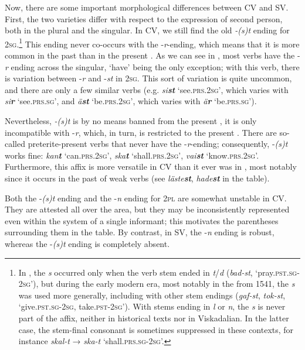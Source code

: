 \documentclass[output=paper,colorlinks,citecolor=brown,draft,draftmode]{langscibook}
\begin{document}
Now, there are some important morphological differences between CV and SV. First, the two varieties differ with respect to the expression of second person, both in the plural and the singular. In CV, we still find the old \textit{-(s)t} ending for 2\textsc{sg}.\footnote{In , the \textit{s} occurred only when the verb stem ended in \textit{t}/\textit{d} (\textit{bad-st}, ‘pray.\textsc{pst.sg}-\textsc{2sg}’), but during the early modern era, most notably in the  from 1541, the \textit{s} was used more generally, including with other stem endings (\textit{gaf-st}, \textit{tok-st}, ‘give.\textsc{pst.sg}-2\textsc{sg}, take.\textsc{pst}-\textsc{2sg}’). With stems ending in \textit{l} or \textit{n}, the \textit{s} is never part of the affix, neither in historical texts nor in Viskadalian. In the latter case, the stem-final consonant is sometimes suppressed in these contexts, for instance \textit{skal-t} → \textit{ska-t} ‘shall.\textsc{prs.sg}-2\textsc{sg}’.} This ending never co-occurs with the -\textit{r}-ending, which means that it is more common in the past than in the present . As we can see in , most verbs have the -\textit{r} ending across the singular, ‘have’ being the only exception; with this verb, there is variation between -\textit{r} and -\textit{st} in 2\textsc{sg}. This sort of variation is quite uncommon, and there are only a few similar verbs (e.g. \textit{si\textbf{{st}}} ‘see.\textsc{prs}.2\textsc{sg}’, which varies with \textit{si\textbf{{r}}} ‘see.\textsc{prs}.\textsc{sg}’, and \textit{ä\textbf{{st}}} ‘be.\textsc{prs.}2\textsc{sg}’, which varies with \textit{ä\textbf{{r}}} ‘be.\textsc{prs}.\textsc{sg}’).



Nevertheless, \textit{-(s)t} is by no means banned from the present , it is only incompatible with -\textit{r}, which, in turn, is restricted to the present . There are so-called preterite-present verbs that never have the -\textit{r}-ending; consequently, -\textit{(s)t} works fine: \textit{kan\textbf{{t}}} ‘can.\textsc{prs}.2\textsc{sg}’, \textit{ska\textbf{{t}}} ‘shall.\textsc{prs}.2\textsc{sg}’, \textit{vai\textbf{{st}}} ‘know.\textsc{prs.}2\textsc{sg}’. Furthermore, this affix is more versatile in CV than it ever was in , most notably since it occurs in the past  of weak verbs (see \textit{läste\textbf{{st}}}, \textit{hade\textbf{{st}}} in the table).



Both the -\textit{(s)t} ending and the -\textit{n} ending for 2\textsc{pl} are somewhat unstable in CV. They are attested all over the area, but they may be inconsistently represented even within the system of a single informant; this motivates the parentheses surrounding them in the table. By contrast, in SV, the -\textit{n} ending is robust, whereas the -\textit{(s)t} ending is completely absent.
\end{document}
